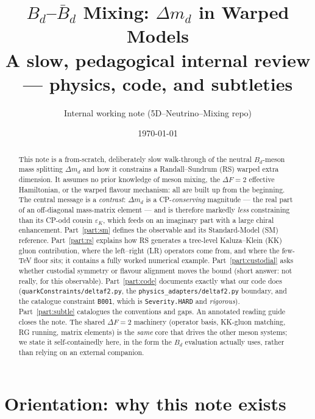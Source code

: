 \documentclass[11pt]{article}
\title{\bf $B_d$--$\bar B_d$ Mixing: $\Delta m_d$ in Warped Models\\[4pt]
\large A slow, pedagogical internal review --- physics, code, and subtleties}
\author{Internal working note (5D--Neutrino--Mixing repo)}
\date{\today}
\newcommand{\dmd}{\Delta m_d}
\newcommand{\epsK}{\varepsilon_K}
\newcommand{\code}[1]{\texttt{#1}}
\theoremstyle{definition}
\begin{document}
\maketitle

\begin{abstract}
\noindent
This note is a from-scratch, deliberately slow walk-through of the neutral
$B_d$-meson mass splitting $\dmd$ and how it constrains a Randall--Sundrum (RS)
warped extra dimension. It assumes no prior knowledge of meson mixing, the
$\Delta F=2$ effective Hamiltonian, or the warped flavour mechanism: all are
built up from the beginning. The central message is a \emph{contrast}: $\dmd$ is
a CP-\emph{conserving} magnitude --- the real part of an off-diagonal mass-matrix
element --- and is therefore markedly \emph{less} constraining than its CP-odd
cousin $\epsK$, which feeds on an imaginary part with a large chiral
enhancement. Part~\ref{part:sm} defines the observable and its Standard-Model
(SM) reference. Part~\ref{part:rs} explains how RS generates a tree-level
Kaluza--Klein (KK) gluon contribution, where the left--right (LR) operators come
from, and where the few-TeV floor sits; it contains a fully worked numerical
example. Part~\ref{part:custodial} asks whether custodial symmetry or flavour
alignment moves the bound (short answer: not really, for this observable).
Part~\ref{part:code} documents exactly what our code does
(\code{quarkConstraints/deltaf2.py}, the \code{physics\_adapters/deltaf2.py}
boundary, and the catalogue constraint \code{B001}, which is
\code{Severity.HARD} and \emph{rigorous}). Part~\ref{part:subtle} catalogues the
conventions and gaps. An annotated reading guide closes the note. The shared
$\Delta F=2$ machinery (operator basis, KK-gluon matching, RG running, matrix
elements) is the \emph{same} core that drives the other meson systems; we state
it self-containedly here, in the form the $B_d$ evaluation actually uses, rather
than relying on an external companion.
\end{abstract}

\tableofcontents

\part*{Orientation: why this note exists}
\end{document}

